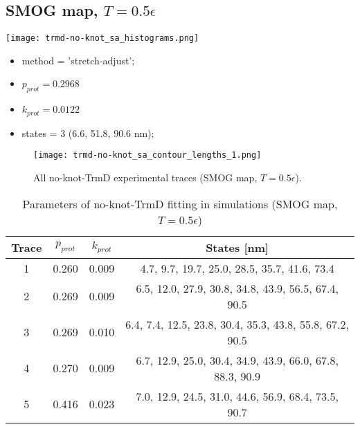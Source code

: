 \subsection{SMOG map, $T=0.5\epsilon$}
\label{subsec:no-knot-trmd-sa}
\begin{minipage}[c]{0.7\textwidth}
    \texttt{[image: trmd-no-knot\_sa\_histograms.png]}
\end{minipage}
\hfill
\begin{minipage}[c]{0.45\textwidth}
    \begin{itemize}
        \item method = 'stretch-adjust';
        \item $p_{prot}=0.2968$
        \item $k_{prot}=0.0122$
        \item states = 3 (6.6, 51.8, 90.6 nm);
    \end{itemize}
\end{minipage}

\begin{figure}
    \centering
    \texttt{[image: trmd-no-knot\_sa\_contour\_lengths\_1.png]}
    \caption{All no-knot-TrmD experimental traces (SMOG map, $T=0.5\epsilon$).}
    \label{fig:no-knot-trmd-sa-cl1}
\end{figure}

\begin{table}
    \tiny
    \centering
    \caption{Parameters of no-knot-TrmD fitting in simulations (SMOG map, $T=0.5\epsilon$)}
    \label{tab:no-knot-trmd-sa-parameters}
    \begin{tabular}{c|c|c|c}
        \textbf{Trace} & \textbf{$p_{prot}$} & \textbf{$k_{prot}$} & \textbf{States [nm]}\\\hline
        1 & 0.260 & 0.009 & 4.7, 9.7, 19.7, 25.0, 28.5, 35.7, 41.6, 73.4\\
        2 & 0.269 & 0.009 & 6.5, 12.0, 27.9, 30.8, 34.8, 43.9, 56.5, 67.4, 90.5\\
        3 & 0.269 & 0.010 & 6.4, 7.4, 12.5, 23.8, 30.4, 35.3, 43.8, 55.8, 67.2, 90.5\\
        4 & 0.270 & 0.009 & 6.7, 12.9, 25.0, 30.4, 34.9, 43.9, 66.0, 67.8, 88.3, 90.9\\
        5 & 0.416 & 0.023 & 7.0, 12.9, 24.5, 31.0, 44.6, 56.9, 68.4, 73.5, 90.7\\
    \end{tabular}
\end{table}

